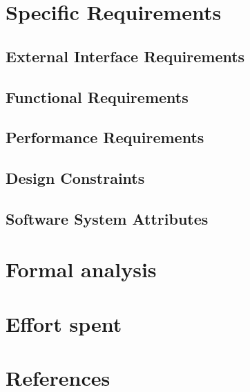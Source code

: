\documentclass[a4paper,oneside,11pt]{article}
\begin{document}
    \newpage
    \section{Specific Requirements}
        \subsection{External Interface Requirements}
            
        \subsection{Functional Requirements}
            
        \subsection{Performance Requirements}
            
        \subsection{Design Constraints}
            
        \subsection{Software System Attributes}
            
    \newpage
    \section{Formal analysis}
        

    \newpage

    \section{Effort spent}
        
    \newpage
    
    \section{References}
        
        
\end{document}
